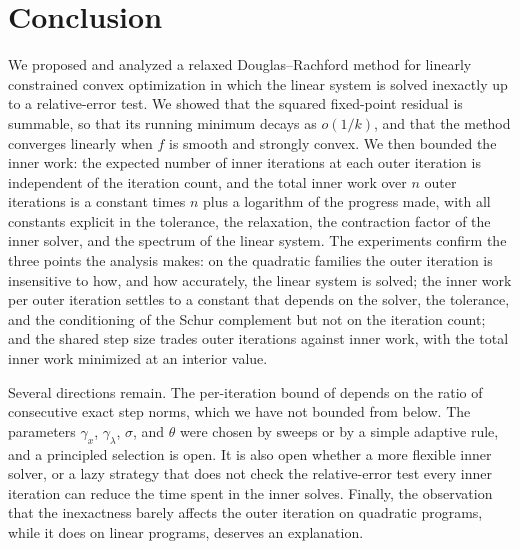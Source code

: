 \documentclass[11pt]{article}
\begin{document}


\section{Conclusion}\label{sec:conclusion}
We proposed and analyzed a relaxed Douglas--Rachford method for linearly constrained convex optimization in which the linear system is solved inexactly up to a relative-error test.
We showed that the squared fixed-point residual is summable, so that its running minimum decays as $o(1/k)$, and that the method converges linearly when $f$ is smooth and strongly convex.
We then bounded the inner work: the expected number of inner iterations at each outer iteration is independent of the iteration count, and the total inner work over $n$ outer iterations is a constant times $n$ plus a logarithm of the progress made, with all constants explicit in the tolerance, the relaxation, the contraction factor of the inner solver, and the spectrum of the linear system.
The experiments confirm the three points the analysis makes: on the quadratic families the outer iteration is insensitive to how, and how accurately, the linear system is solved; the inner work per outer iteration settles to a constant that depends on the solver, the tolerance, and the conditioning of the Schur complement but not on the iteration count; and the shared step size trades outer iterations against inner work, with the total inner work minimized at an interior value.

Several directions remain.
The per-iteration bound of  depends on the ratio of consecutive exact step norms, which we have not bounded from below.
The parameters $\gamma_x$, $\gamma_\lambda$, $\sigma$, and $\theta$ were chosen by sweeps or by a simple adaptive rule, and a principled selection is open.
It is also open whether a more flexible inner solver, or a lazy strategy that does not check the relative-error test every inner iteration can reduce the time spent in the inner solves.
Finally, the observation that the inexactness barely affects the outer iteration on quadratic programs, while it does on linear programs, deserves an explanation.


\end{document}
